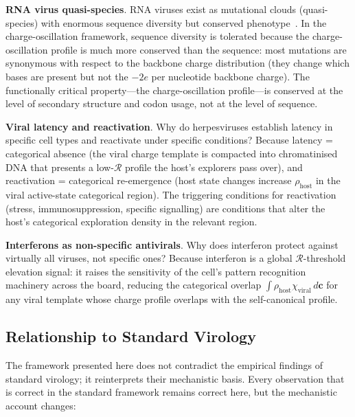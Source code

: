 \documentclass[12pt,a4paper]{article}
\theoremstyle{definition}
\theoremstyle{remark}
\newcommand{\Rcat}{\mathcal{R}}
\newcommand{\Phost}{\rho_{\mathrm{host}}}
\newcommand{\chiviral}{\chi_{\mathrm{viral}}}
\newcommand{\vv}[1]{\boldsymbol{#1}}
\begin{document}
\textbf{RNA virus quasi-species}. RNA viruses exist as mutational clouds (quasi-species) with enormous sequence diversity but conserved phenotype~\cite{Domingo2012}. In the charge-oscillation framework, sequence diversity is tolerated because the charge-oscillation profile is much more conserved than the sequence: most mutations are synonymous with respect to the backbone charge distribution (they change which bases are present but not the $-2e$ per nucleotide backbone charge). The functionally critical property---the charge-oscillation profile---is conserved at the level of secondary structure and codon usage, not at the level of sequence.

\textbf{Viral latency and reactivation}. Why do herpesviruses establish latency in specific cell types and reactivate under specific conditions? Because latency = categorical absence (the viral charge template is compacted into chromatinised DNA that presents a low-$\Rcat$ profile the host's explorers pass over), and reactivation = categorical re-emergence (host state changes increase $\Phost$ in the viral active-state categorical region). The triggering conditions for reactivation (stress, immunosuppression, specific signalling) are conditions that alter the host's categorical exploration density in the relevant region.

\textbf{Interferons as non-specific antivirals}. Why does interferon protect against virtually all viruses, not specific ones? Because interferon is a global $\Rcat$-threshold elevation signal: it raises the sensitivity of the cell's pattern recognition machinery across the board, reducing the categorical overlap $\int \Phost \chiviral\,d\vv{c}$ for any viral template whose charge profile overlaps with the self-canonical profile.

\subsection{Relationship to Standard Virology}

The framework presented here does not contradict the empirical findings of standard virology; it reinterprets their mechanistic basis. Every observation that is correct in the standard framework remains correct here, but the mechanistic account changes:
\end{document}

